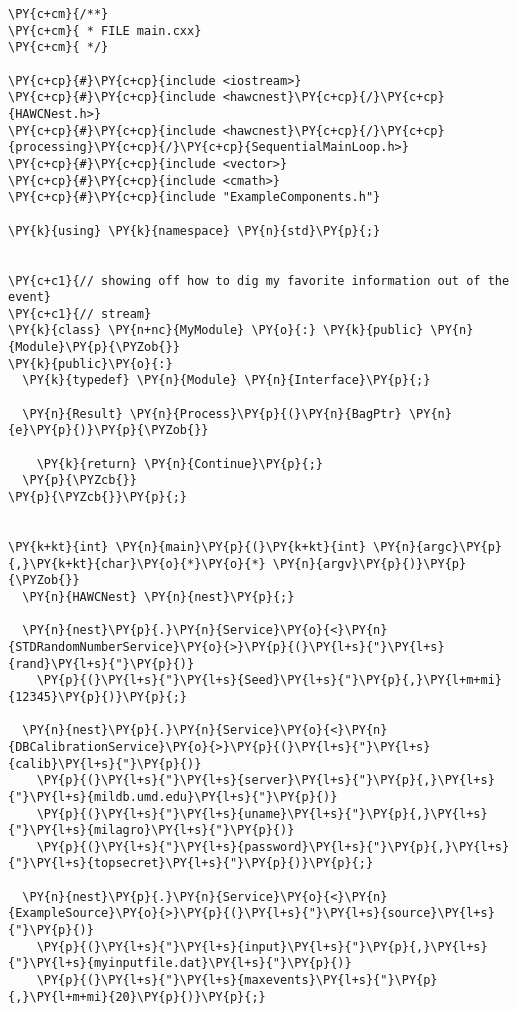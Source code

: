 \begin{Verbatim}[commandchars=\\\{\}]
\PY{c+cm}{/**}
\PY{c+cm}{ * FILE main.cxx}
\PY{c+cm}{ */}

\PY{c+cp}{#}\PY{c+cp}{include <iostream>}
\PY{c+cp}{#}\PY{c+cp}{include <hawcnest}\PY{c+cp}{/}\PY{c+cp}{HAWCNest.h>}
\PY{c+cp}{#}\PY{c+cp}{include <hawcnest}\PY{c+cp}{/}\PY{c+cp}{processing}\PY{c+cp}{/}\PY{c+cp}{SequentialMainLoop.h>}
\PY{c+cp}{#}\PY{c+cp}{include <vector>}
\PY{c+cp}{#}\PY{c+cp}{include <cmath>}
\PY{c+cp}{#}\PY{c+cp}{include "ExampleComponents.h"}

\PY{k}{using} \PY{k}{namespace} \PY{n}{std}\PY{p}{;}


\PY{c+c1}{// showing off how to dig my favorite information out of the event}
\PY{c+c1}{// stream}
\PY{k}{class} \PY{n+nc}{MyModule} \PY{o}{:} \PY{k}{public} \PY{n}{Module}\PY{p}{\PYZob{}}
\PY{k}{public}\PY{o}{:}
  \PY{k}{typedef} \PY{n}{Module} \PY{n}{Interface}\PY{p}{;}

  \PY{n}{Result} \PY{n}{Process}\PY{p}{(}\PY{n}{BagPtr} \PY{n}{e}\PY{p}{)}\PY{p}{\PYZob{}}

    \PY{k}{return} \PY{n}{Continue}\PY{p}{;}
  \PY{p}{\PYZcb{}}
\PY{p}{\PYZcb{}}\PY{p}{;}


\PY{k+kt}{int} \PY{n}{main}\PY{p}{(}\PY{k+kt}{int} \PY{n}{argc}\PY{p}{,}\PY{k+kt}{char}\PY{o}{*}\PY{o}{*} \PY{n}{argv}\PY{p}{)}\PY{p}{\PYZob{}}
  \PY{n}{HAWCNest} \PY{n}{nest}\PY{p}{;}

  \PY{n}{nest}\PY{p}{.}\PY{n}{Service}\PY{o}{<}\PY{n}{STDRandomNumberService}\PY{o}{>}\PY{p}{(}\PY{l+s}{"}\PY{l+s}{rand}\PY{l+s}{"}\PY{p}{)}
    \PY{p}{(}\PY{l+s}{"}\PY{l+s}{Seed}\PY{l+s}{"}\PY{p}{,}\PY{l+m+mi}{12345}\PY{p}{)}\PY{p}{;}

  \PY{n}{nest}\PY{p}{.}\PY{n}{Service}\PY{o}{<}\PY{n}{DBCalibrationService}\PY{o}{>}\PY{p}{(}\PY{l+s}{"}\PY{l+s}{calib}\PY{l+s}{"}\PY{p}{)}
    \PY{p}{(}\PY{l+s}{"}\PY{l+s}{server}\PY{l+s}{"}\PY{p}{,}\PY{l+s}{"}\PY{l+s}{mildb.umd.edu}\PY{l+s}{"}\PY{p}{)}
    \PY{p}{(}\PY{l+s}{"}\PY{l+s}{uname}\PY{l+s}{"}\PY{p}{,}\PY{l+s}{"}\PY{l+s}{milagro}\PY{l+s}{"}\PY{p}{)}
    \PY{p}{(}\PY{l+s}{"}\PY{l+s}{password}\PY{l+s}{"}\PY{p}{,}\PY{l+s}{"}\PY{l+s}{topsecret}\PY{l+s}{"}\PY{p}{)}\PY{p}{;}

  \PY{n}{nest}\PY{p}{.}\PY{n}{Service}\PY{o}{<}\PY{n}{ExampleSource}\PY{o}{>}\PY{p}{(}\PY{l+s}{"}\PY{l+s}{source}\PY{l+s}{"}\PY{p}{)}
    \PY{p}{(}\PY{l+s}{"}\PY{l+s}{input}\PY{l+s}{"}\PY{p}{,}\PY{l+s}{"}\PY{l+s}{myinputfile.dat}\PY{l+s}{"}\PY{p}{)}
    \PY{p}{(}\PY{l+s}{"}\PY{l+s}{maxevents}\PY{l+s}{"}\PY{p}{,}\PY{l+m+mi}{20}\PY{p}{)}\PY{p}{;}


\end{Verbatim}
